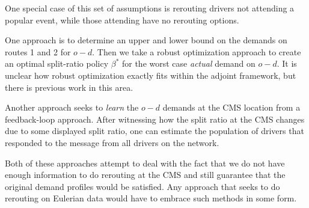 One special case of this set of assumptions is rerouting drivers not
attending a popular event, while those attending have no rerouting
options.

One approach is to determine an upper and lower bound on the demands
on routes 1 and 2 for $o-d$. Then we take a robust optimization approach
to create an optimal split-ratio policy $\beta^{*}$ for the worst
case \emph{actual} demand on $o-d$. It is unclear how robust optimization
exactly fits within the adjoint framework, but there is previous work
in this area.

Another approach seeks to \emph{learn} the $o-d$ demands at the CMS
location from a feedback-loop approach. After witnessing how the split
ratio at the CMS changes due to some displayed split ratio, one can
estimate the population of drivers that responded to the message from
all drivers on the network.

Both of these approaches attempt to deal with the fact that we do
not have enough information to do rerouting at the CMS and still guarantee
that the original demand profiles would be satisfied. Any approach
that seeks to do rerouting on Eulerian data would have to embrace
such methods in some form.
